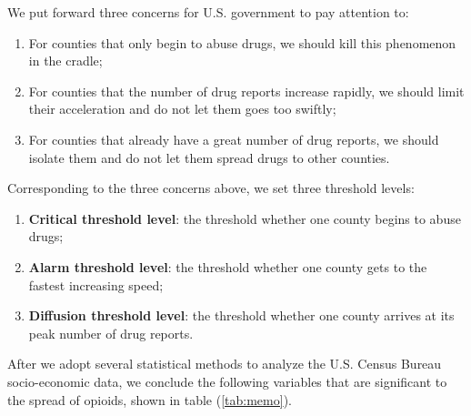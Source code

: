 \documentclass{mcmthesis}
\numberwithin{equation}{section}
\numberwithin{figure}{section}
\numberwithin{table}{section}
\theoremstyle{mydef}
\begin{document}
We put forward three concerns for U.S. government to pay attention to:
\begin{enumerate}
\item For counties that only begin to abuse drugs, we should kill this phenomenon in the cradle;
\item  For counties that the number of drug reports increase rapidly, we should limit their acceleration and do not let them goes too swiftly;
\item For counties that already have a great number of drug reports, we should isolate them and do not let them spread drugs to other counties.
\end{enumerate}
Corresponding to the three concerns above, we set three threshold levels:
\begin{enumerate}
\item {\bf{Critical threshold level}}: the threshold whether one county begins to abuse drugs;
\item {\bf{Alarm threshold level}}: the threshold whether one county gets to the fastest increasing speed;
\item {\bf{Diffusion threshold level}}: the threshold whether one county arrives at its peak number of drug reports.
\end{enumerate}

After we adopt several statistical methods to analyze the U.S. Census Bureau socio-economic data, we conclude the following variables that are significant to the spread of opioids, shown in table (\ref{tab:memo}).
\end{document}
